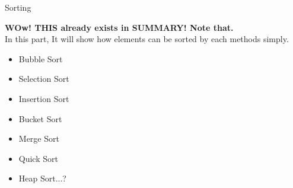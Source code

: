 \begin{section}
    {Sorting}

    \textbf{WOw! THIS already exists in SUMMARY! Note that.}\\
    In this part, It will show how elements can be sorted by each methods simply.
    \begin{itemize}
        \item Bubble Sort
        \item Selection Sort
        \item Insertion Sort
        \item Bucket Sort
        \item Merge Sort
        \item Quick Sort
        \item Heap Sort...?
    \end{itemize}

\bigskip
\end{section}